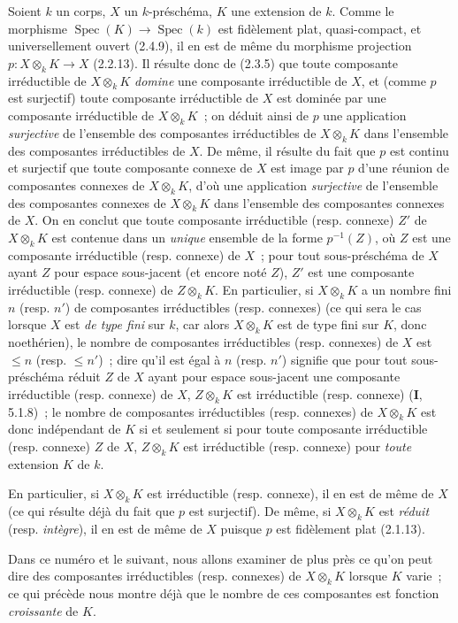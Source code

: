 \begin{env}[4.4.1]
\label{IV.2.4.4.1-fr}
Soient $k$ un corps, $X$ un $k$-préschéma, $K$ une extension de $k$. Comme le
morphisme $\operatorname{Spec}(K)\to\operatorname{Spec}(k)$ est fidèlement
plat, quasi-compact, et universellement ouvert (2.4.9), il en est de même du
morphisme projection $p:X\otimes_k K\to X$ (2.2.13). Il résulte donc de
(2.3.5) que toute composante irréductible de $X\otimes_k K$ \emph{domine} une
composante irréductible de $X$, et (comme $p$ est surjectif) toute composante
irréductible de $X$ est dominée par une composante irréductible de
$X\otimes_k K$~; on déduit ainsi de $p$ une application \emph{surjective} de
l'ensemble des composantes irréductibles de $X\otimes_k K$ dans l'ensemble
des composantes irréductibles de $X$. De même, il résulte du fait que $p$ est
continu et surjectif que toute composante connexe de $X$ est image par $p$
d'une réunion de composantes connexes de $X\otimes_k K$, d'où une application
\emph{surjective} de l'ensemble des composantes connexes de $X\otimes_k K$
dans l'ensemble des composantes connexes de $X$. On en conclut que toute
composante irréductible (resp. connexe) $Z'$ de $X\otimes_k K$ est contenue
dans un \emph{unique} ensemble de la forme $p^{-1}(Z)$, où $Z$ est une
composante irréductible (resp. connexe) de $X$~; pour tout sous-préschéma de
$X$ ayant $Z$ pour espace sous-jacent (et encore noté $Z$), $Z'$ est une
composante irréductible (resp. connexe) de $Z\otimes_k K$. En particulier, si
$X\otimes_k K$ a un nombre fini $n$ (resp. $n'$) de composantes irréductibles
(resp. connexes) (ce qui sera le cas lorsque $X$ est \emph{de type fini} sur
$k$, car alors $X\otimes_k K$ est de type fini sur $K$, donc noethérien), le
nombre de composantes irréductibles (resp. connexes) de $X$ est $\leqslant n$
(resp. $\leqslant n'$)~; dire qu'il est égal à $n$ (resp. $n'$) signifie que
pour tout sous-préschéma réduit $Z$ de $X$ ayant pour espace sous-jacent une
composante irréductible (resp. connexe) de $X$, $Z\otimes_k K$ est
irréductible (resp. connexe) (\textbf{I}, 5.1.8)~; le nombre de composantes
irréductibles (resp. connexes) de $X\otimes_k K$ est donc indépendant de $K$
si et seulement si pour toute composante irréductible (resp. connexe) $Z$ de
$X$, $Z\otimes_k K$ est irréductible (resp. connexe) pour \emph{toute}
extension $K$ de $k$.

En particulier, si $X\otimes_k K$ est irréductible (resp. connexe), il en est
de même de $X$ (ce qui résulte déjà du fait que $p$ est surjectif). De même, si
$X\otimes_k K$ est \emph{réduit} (resp. \emph{intègre}), il en est de même de
$X$ puisque $p$ est fidèlement plat (2.1.13).

Dans ce numéro et le suivant, nous allons examiner de plus près ce qu'on peut
dire des composantes irréductibles (resp. connexes) de $X\otimes_k K$ lorsque
$K$ varie~; ce qui précède nous montre déjà que le nombre de ces composantes
est fonction \emph{croissante} de $K$.
\end{env}

